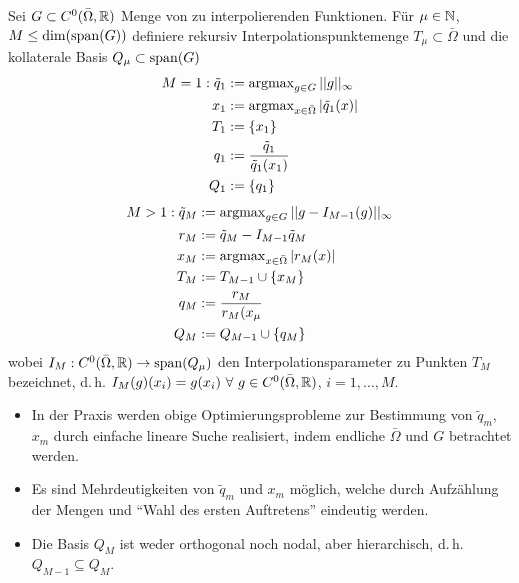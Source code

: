 \begin{defn} \label{4.1}
	Sei $G \subset C^0(\bar{\Omega},\mathbb{R})$ Menge von zu interpolierenden Funktionen. Für $\mu \in \mathbb{N}$, $M \leq \dim(\operatorname{span}(G))$ definiere rekursiv Interpolationspunktemenge $T_{\mu} \subset \bar{\Omega}$ und die kollaterale Basis $Q_{\mu} \subset \operatorname{span} (G)$
	\begin{align*}
	M = 1: \tilde{q}_1 &:= \operatorname{argmax}_{g \in G} ||g||_{\infty} \\
	x_1 &:= \operatorname{argmax}_{x \in \bar{\Omega}} |\tilde{q}_1 (x)| \\
	T_1 &:= \{x_1\} \\
	q_1 &:= \frac{\tilde{q}_1}{\tilde{q}_1 (x_1)} \\
	Q_1 &:= \{q_1\}
	\end{align*}
	\begin{align*}
	M > 1: \tilde{q}_M &:= \operatorname{argmax}_{g \in G} ||g-I_{M-1}(g)||_{\infty} \\
	r_M &:= \tilde{q}_M - I_{M-1} \tilde{q}_M \\
	x_M &:= \operatorname{argmax}_{x \in \bar{\Omega}} |r_M (x)| \\
	T_M &:= T_{M-1} \cup \{x_M\} \\
	q_M &:= \frac{r_M}{r_M (x_{\mu}} \\
	Q_M &:= Q_{M-1} \cup \{ q_M \}
	\end{align*}
	wobei $I_M : C^0(\bar{\Omega},\mathbb{R}) \rightarrow \operatorname{span}(Q_{\mu})$ den Interpolationsparameter zu Punkten $T_M$ bezeichnet, d.\,h. $I_M(g)(x_i) = g(x_i) \,\, \forall \,\, g \in C^0(\bar{\Omega},\mathbb{R})$, $i=1,\dots,M$.
\end{defn}

\begin{bem} \beginwithlistbem
	\begin{itemize}
		\item In der Praxis werden obige Optimierungsprobleme zur Bestimmung von $\tilde{q}_m$, $x_m$ durch einfache lineare Suche realisiert, indem endliche $\bar{\Omega}$ und $G$ betrachtet werden.
		\item Es sind Mehrdeutigkeiten von  $\tilde{q}_m$ und $x_m$ möglich, welche durch Aufzählung der Mengen und ``Wahl des ersten Auftretens'' eindeutig werden.
		\item Die Basis $Q_M$ ist weder orthogonal noch nodal, aber hierarchisch, d.\,h. $Q_{M-1} \subseteq Q_M$.
	\end{itemize}
\end{bem}

